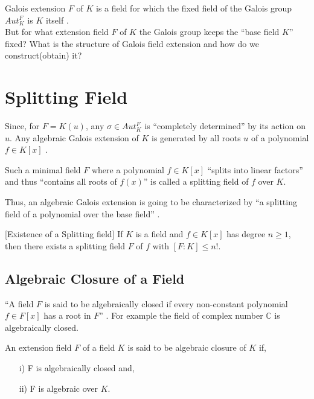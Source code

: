 Galois extension \(F\) of  \(K\) is a field for which the fixed field of the Galois group \(Aut_K^F\) is \(K\) itself \cite{hunger}.\\
But for what extension field \(F\) of \(K\) the Galois group keeps the ``base field \(K\)'' fixed? What is the structure of Galois field extension and how do we construct(obtain) it?


\section{Splitting Field}
Since, for \(F=K(u)\), any \(\sigma \in Aut_K^F\) is ``completely determined'' \cite{hunger} by its action on \(u\). Any algebraic Galois extension of \(K\) is generated by all roots \(u\) of a polynomial \(f \in K[x]\) \cite{hunger}.

\begin{definition} \cite{hunger}
  Such a minimal field \(F\) where a polynomial \(f \in K[x]\) ``splits into linear factors'' and thus ``contains all roots of \(f(x)\)'' is called a splitting field of \(f\) over \(K\).
\end{definition}
Thus, an algebraic Galois extension is going to be characterized by ``a splitting field of a polynomial over the base field'' \cite{hunger}.
\vspace{3mm}

\begin{theorem} \cite{hunger} [Existence of a Splitting field]
  If \(K\) is a field and \(f \in K[x]\) has degree \(n \geq 1\), then there exists a splitting field \(F\) of \(f\) with \([F:K] \leq n!\).
  \end{theorem}

\subsection{Algebraic Closure of a Field}
``A field \(F\) is said to be algebraically closed if every non-constant polynomial \(f \in F[x]\) has a root in \(F\)'' \cite{hunger}.
For example the field of complex number \(\mathbb{C}\) is algebraically closed.\\[3mm]

\begin{definition} \cite{hunger}
An extension field \(F\) of a field \(K\) is said to be algebraic closure of \(K\) if,
\begin{enumerate}
\item[i)] F is algebraically closed and,
  \item[ii)] F is algebraic over \(K\).
  \end{enumerate}
\end{definition}


